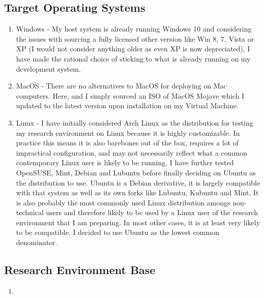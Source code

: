 \documentclass{article}
\begin{document}
\subsection{Target Operating Systems}
\begin{enumerate}
    \item Windows - My host system is already running Windows 10 and considering the issues with  sourcing a fully licensed other version like Win 8, 7, Vista or XP (I would not consider anything older as even XP is now depreciated), I have made the rational choice of sticking to what is already running on my development system.
    \item MacOS - There are no alternatives to MacOS for deploying on Mac computers. Here, and I simply sourced an ISO of MacOS Mojave which I updated to the latest version upon installation on my Virtual Machine.
    \item Linux - I have initially considered Arch Linux as the distribution for testing my research environment on Linux because it is highly customizable. In practice this means it is also barebones out of the box, requires a lot of impractical configuration, and may not necessarily reflect what a common contemporary Linux user is likely to be running. I have further tested OpenSUSE, Mint, Debian and Lubuntu before finally deciding on Ubuntu as the distribution to use. Ubuntu is a Debian derivative, it is largely compatible with that system as well as its own forks like Lubuntu, Kubuntu and Mint. It is also probably the most commonly used Linux distribution amongs non-technical users and therefore likely to be used by a Linux user of the research environment that I am preparing. In most other cases, it is at least very likely to be compatible. I decided to use Ubuntu as the lowest common denominator.
\end{enumerate}
\subsection{Research Environment Base}
\begin{enumerate}
    \item 
\end{enumerate}
\end{document}
